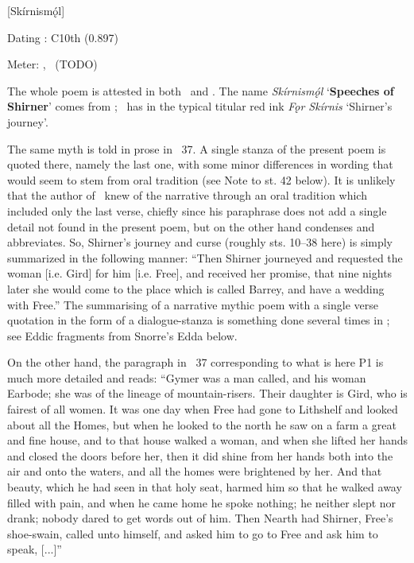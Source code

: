 [Skírnismǫ́l]

\begin{flushright}%
Dating \parencite{Sapp2022}: C10th (0.897)

Meter: \Ljodahattr, \Galdralag\ (TODO)%
\end{flushright}


The whole poem is attested in both \Regius\ and \AM. The name \emph{Skírnismǫ́l} ‘\textbf{Speeches of Shirner}’ comes from \AM; \Regius\ has in the typical titular red ink \emph{Fǫr Skírnis} ‘Shirner’s journey’.

The same myth is told in prose in \Gylfaginning\ 37.  A single stanza of the present poem is quoted there, namely the last one, with some minor differences in wording that would seem to stem from oral tradition (see Note to st. 42 below).  It is unlikely that the author of \Gylfaginning\ knew of the narrative through an oral tradition which included only the last verse, chiefly since his paraphrase does not add a single detail not found in the present poem, but on the other hand condenses and abbreviates.  So, Shirner’s journey and curse (roughly sts. 10–38 here) is simply summarized in the following manner: “Then Shirner journeyed and requested the woman [i.e. Gird] for him [i.e. Free], and received her promise, that nine nights later she would come to the place which is called Barrey, and have a wedding with Free.”  The summarising of a narrative mythic poem with a single verse quotation in the form of a dialogue-stanza is something done several times in \Gylfaginning; see Eddic fragments from Snorre’s Edda below.

On the other hand, the paragraph in \Gylfaginning\ 37 corresponding to what is here P1 is much more detailed and reads: “Gymer was a man called, and his woman Earbode; she was of the lineage of mountain-risers. Their daughter is Gird, who is fairest of all women.  It was one day when Free had gone to Lithshelf and looked about all the Homes, but when he looked to the north he saw on a farm a great and fine house, and to that house walked a woman, and when she lifted her hands and closed the doors before her, then it did shine from her hands both into the air and onto the waters, and all the homes were brightened by her.  And that beauty, which he had seen in that holy seat, harmed him so that he walked away filled with pain, and when he came home he spoke nothing; he neither slept nor drank; nobody dared to get words out of him.  Then Nearth had Shirner, Free’s shoe-swain, called unto himself, and asked him to go to Free and ask him to speak, [...]”

